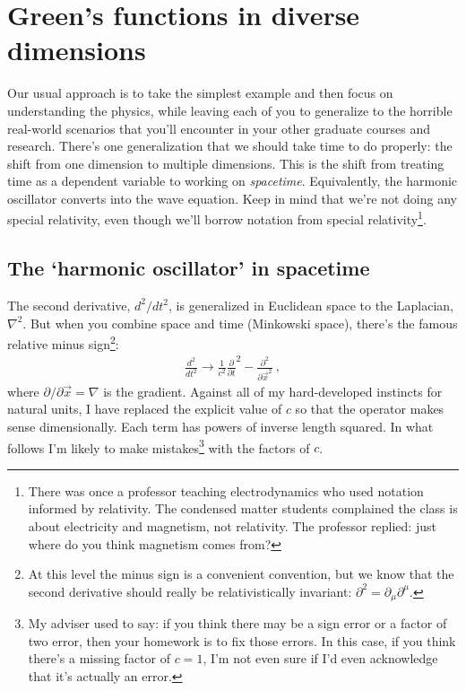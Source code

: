
\section{Green's functions in diverse dimensions}

Our usual approach is to take the simplest example and then focus on understanding the physics, while leaving each of you to generalize to the horrible real-world scenarios that you'll encounter in your other graduate courses and research. There's one generalization that we should take time to do properly: the shift from one dimension to multiple dimensions. This is the shift from treating time as a dependent variable to working on \emph{spacetime}. Equivalently, the harmonic oscillator converts into the wave equation.
%
Keep in mind that we're not doing any special relativity, even though we'll borrow notation from special relativity\footnote{There was once a professor teaching electrodynamics who used notation informed by relativity. The condensed matter students complained the class is about electricity and magnetism, not relativity. The professor replied: just where do you think magnetism comes from?}. 

\subsection{The `harmonic oscillator' in spacetime}
The second derivative, $d^2/dt^2$, is generalized in Euclidean space to the Laplacian, $\nabla^2$. But when you combine space and time (Minkowski space), there's the famous relative minus sign\footnote{At this level the minus sign is a convenient convention, but we know that the second derivative should really be relativistically invariant: $\partial^2 = \partial_\mu \partial^\mu$.}:
\begin{align}
	\frac{d^2}{dt^2}
	\to 
	\frac{1}{c^2}
	\frac{\partial}{\partial t}^2
	-
	\frac{\partial^2}
	{\partial \vec x^2} \ ,
\end{align}
where $\partial/\partial\vec x = \nabla$ is the gradient. Against all of my hard-developed instincts for natural units, I have replaced the explicit value of $c$ so that the operator makes sense dimensionally. Each term has powers of inverse length squared. In what follows I'm likely to make mistakes\footnote{My adviser used to say: if you think there may be a sign error or a factor of two error, then your homework is to fix those errors. In this case, if you think there's a missing factor of $c=1$, I'm not even sure if I'd even acknowledge that it's actually an error.} with the factors of $c$. 


